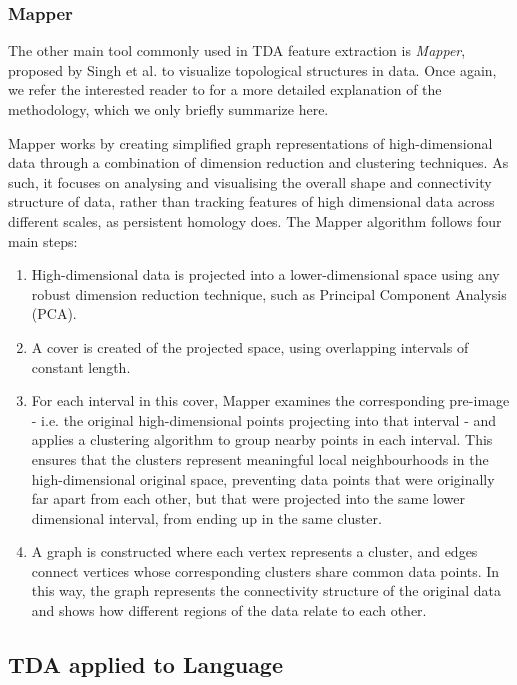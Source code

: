 \documentclass[12pt,twoside]{report}
\begin{document}
\subsubsection{Mapper}

The other main tool commonly used in TDA feature extraction is \textit{Mapper}, proposed by Singh et al. \cite{singh2007} to visualize topological structures in data. Once again, we refer the interested reader to \cite{uchendu2024unveilingtopologicalstructurestext} for a more detailed explanation of the methodology, which we only briefly summarize here. \newline \par

Mapper works by creating simplified graph representations of high-dimensional data through a combination of dimension reduction and clustering techniques. As such, it focuses on analysing and visualising the overall shape and connectivity structure of data, rather than tracking features of high dimensional data across different scales, as persistent homology does. The Mapper algorithm follows four main steps: 
\begin{enumerate}[itemsep=0pt]
    \item High-dimensional data is projected into a lower-dimensional space using any robust dimension reduction technique, such as Principal Component Analysis (PCA).
    \item A cover is created of the projected space, using overlapping intervals of constant length.
    \item For each interval in this cover, Mapper examines the corresponding pre-image - i.e. the original high-dimensional points projecting into that interval - and applies a clustering algorithm to group nearby points in each interval. This ensures that the clusters represent meaningful local neighbourhoods in the high-dimensional original space, preventing data points that were originally far apart from each other, but that were projected into the same lower dimensional interval, from ending up in the same cluster.
    \item A graph is constructed where each vertex represents a cluster, and edges connect vertices whose corresponding clusters share common data points. In this way, the graph represents the connectivity structure of the original data and shows how different regions of the data relate to each other. 
\end{enumerate}   

\subsection{TDA applied to Language}
\end{document}
